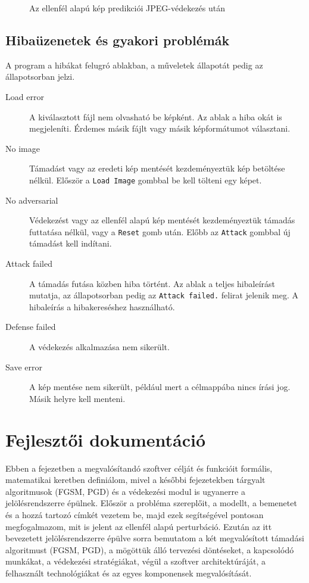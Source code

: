 \begin{figure}[htb]
\centering
{}
\caption{Az ellenfél alapú kép predikciói JPEG-védekezés után}
\label{fig:gui-vedekezes}
\end{figure}

\section{Hibaüzenetek és gyakori problémák}
A program a hibákat felugró ablakban, a műveletek állapotát pedig az állapotsorban jelzi. 

\begin{description}
  \item[Load error] A kiválasztott fájl nem olvasható be képként. 
        Az ablak a hiba okát is megjeleníti. 
        Érdemes másik fájlt vagy másik képformátumot választani. 
  \item[No image] Támadást vagy az eredeti kép mentését kezdeményeztük kép betöltése nélkül. 
        Először a \texttt{Load Image} gombbal be kell tölteni egy képet. 
  \item[No adversarial] Védekezést vagy az ellenfél alapú kép mentését kezdeményeztük támadás futtatása nélkül, vagy a 
        \texttt{Reset} gomb után. 
        Előbb az \texttt{Attack} gombbal új támadást kell indítani. 
  \item[Attack failed] A támadás futása közben hiba történt. 
        Az ablak a teljes hibaleírást mutatja, az állapotsorban pedig az \texttt{Attack failed.} felirat jelenik meg. 
        A hibaleírás a hibakereséshez használható. 
  \item[Defense failed] A védekezés alkalmazása nem sikerült. 
  \item[Save error] A kép mentése nem sikerült, például mert a célmappába nincs írási jog. 
        Másik helyre kell menteni. 
\end{description}

\chapter{Fejlesztői dokumentáció}
Ebben a fejezetben a megvalósítandó szoftver célját és funkcióit formális, matematikai keretben definiálom, mivel a későbbi 
fejezetekben tárgyalt algoritmusok (FGSM, PGD) és a védekezési modul is ugyanerre a jelölésrendszerre épülnek. 
Először a probléma szereplőit, a modellt, a bemenetet és a hozzá tartozó címkét vezetem be, majd ezek segítségével pontosan 
megfogalmazom, mit is jelent az ellenfél alapú perturbáció. 
Ezután az itt bevezetett jelölésrendszerre épülve sorra bemutatom a két megvalósított támadási algoritmust (FGSM, PGD), a 
mögöttük álló tervezési döntéseket, a kapcsolódó munkákat, a védekezési stratégiákat, végül a szoftver architektúráját, a 
felhasznált technológiákat és az egyes komponensek megvalósítását. 


